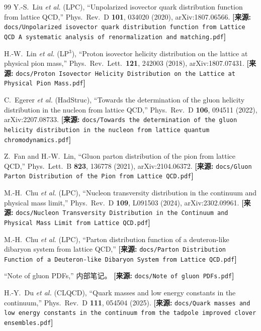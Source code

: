 \documentclass[12pt,a4paper]{ctexart}
\theoremstyle{definition}
\begin{document}
\begin{thebibliography}{99}
Y.-S.~Liu \textit{et al.} (LPC),
``Unpolarized isovector quark distribution function from lattice QCD,''
Phys.\ Rev.\ D \textbf{101}, 034020 (2020), arXiv:1807.06566.
\quad\textbf{[来源:} \texttt{docs/Unpolarized isovector quark distribution function from Lattice QCD A systematic analysis of renormalization and matching.pdf}\textbf{]}

H.-W.~Lin \textit{et al.} (LP$^3$),
``Proton isovector helicity distribution on the lattice at physical pion mass,''
Phys.\ Rev.\ Lett.\ \textbf{121}, 242003 (2018), arXiv:1807.07431.
\quad\textbf{[来源:} \texttt{docs/Proton Isovector Helicity Distribution on the Lattice at Physical Pion Mass.pdf}\textbf{]}

C.~Egerer \textit{et al.} (HadStruc),
``Towards the determination of the gluon helicity distribution in the nucleon from lattice QCD,''
Phys.\ Rev.\ D \textbf{106}, 094511 (2022), arXiv:2207.08733.
\quad\textbf{[来源:} \texttt{docs/Towards the determination of the gluon helicity distribution in the nucleon from lattice quantum chromodynamics.pdf}\textbf{]}

Z.~Fan and H.-W.~Lin,
``Gluon parton distribution of the pion from lattice QCD,''
Phys.\ Lett.\ B \textbf{823}, 136778 (2021), arXiv:2104.06372.
\quad\textbf{[来源:} \texttt{docs/Gluon Parton Distribution of the Pion from Lattice QCD.pdf}\textbf{]}

M.-H.~Chu \textit{et al.} (LPC),
``Nucleon transversity distribution in the continuum and physical mass limit,''
Phys.\ Rev.\ D \textbf{109}, L091503 (2024), arXiv:2302.09961.
\quad\textbf{[来源:} \texttt{docs/Nucleon Transversity Distribution in the Continuum and Physical Mass Limit from Lattice QCD.pdf}\textbf{]}

M.-H.~Chu \textit{et al.} (LPC),
``Parton distribution function of a deuteron-like dibaryon system from lattice QCD,''
\quad\textbf{[来源:} \texttt{docs/Parton Distribution Function of a Deuteron-like Dibaryon System from Lattice QCD.pdf}\textbf{]}

``Note of gluon PDFs,'' 内部笔记。
\quad\textbf{[来源:} \texttt{docs/Note of gluon PDFs.pdf}\textbf{]}

H.-Y.~Du \textit{et al.} (CLQCD), ``Quark masses and low energy constants in the continuum,''
Phys.\ Rev.\ D \textbf{111}, 054504 (2025).
\quad\textbf{[来源:} \texttt{docs/Quark masses and low energy constants in the continuum from the tadpole improved clover ensembles.pdf}\textbf{]}

\end{thebibliography}
\end{document}

